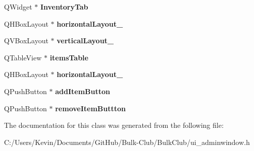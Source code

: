 \begin{DoxyCompactItemize}
Q\+Widget $\ast$ {\bfseries Inventory\+Tab}
\item 
\mbox{\label{class_ui___admin_window_a979bbb0f91147574bf1cc4fa7f8cbd22}} 
Q\+H\+Box\+Layout $\ast$ {\bfseries horizontal\+Layout\+\_}
\item 
\mbox{\label{class_ui___admin_window_a7777f42d3712aaf2ceca156d192ac723}} 
Q\+V\+Box\+Layout $\ast$ {\bfseries vertical\+Layout\+\_}
\item 
\mbox{\label{class_ui___admin_window_a95c08ec4766102fed60391adf8b9c50d}} 
Q\+Table\+View $\ast$ {\bfseries items\+Table}
\item 
\mbox{\label{class_ui___admin_window_ae03006382e364e4848e39838b1a8e0cc}} 
Q\+H\+Box\+Layout $\ast$ {\bfseries horizontal\+Layout\+\_}
\item 
\mbox{\label{class_ui___admin_window_a1e7fa141955315d3fbadeb5b2de80568}} 
Q\+Push\+Button $\ast$ {\bfseries add\+Item\+Button}
\item 
\mbox{\label{class_ui___admin_window_a47d048719aec2e2755649c1118e55ec2}} 
Q\+Push\+Button $\ast$ {\bfseries remove\+Item\+Buttton}
\end{DoxyCompactItemize}


The documentation for this class was generated from the following file\+:\begin{DoxyCompactItemize}
\item 
C\+:/\+Users/\+Kevin/\+Documents/\+Git\+Hub/\+Bulk-\/\+Club/\+Bulk\+Club/ui\+\_\+adminwindow.\+h\end{DoxyCompactItemize}
